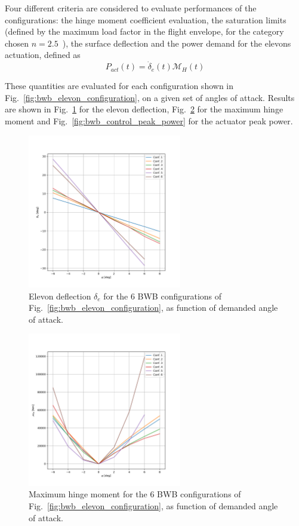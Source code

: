 Four different criteria are considered to evaluate performances of the configurations: the hinge moment coefficient evaluation, the saturation limits (defined by the maximum load factor in the flight envelope, for the category chosen $n=2.5$~\cite{bib:megson}), the surface deflection and the power demand for the elevons actuation, defined as~\cite{bib:fraj}
\begin{equation}
	\label{eq:actuator_power_demand}
	P_{act}\left(t\right) = \dot{\delta}_{e}\left(t\right)\mathcal{M}_{H}\left(t\right)
\end{equation}

These quantities are evaluated for each configuration shown in Fig.~\ref{fig:bwb_elevon_configuration}, on a given set of angles of attack. 
Results are shown in Fig.~\ref{fig:bwb_control_elevon_deflection} for the elevon deflection, Fig.~\ref{fig:bwb_control_hinge_moment} for the maximum hinge moment and Fig.~\ref{fig:bwb_control_peak_power} for the actuator peak power. 
\begin{figure}[!h]
	\centering
	\includegraphics[keepaspectratio, width=0.6\textwidth]{images/chap4/bwb_control_elevon_deflection}
	\caption{Elevon deflection $\delta_{e}$ for the 6 BWB configurations of Fig.~\ref{fig:bwb_elevon_configuration}, as function of demanded angle of attack.}
	\label{fig:bwb_control_elevon_deflection}
\end{figure}
\begin{figure}[!h]
	\centering
	\includegraphics[keepaspectratio, width=0.6\textwidth]{images/chap4/bwb_control_hinge_moment}
	\caption{Maximum hinge moment for the 6 BWB configurations of Fig.~\ref{fig:bwb_elevon_configuration}, as function of demanded angle of attack.}
	\label{fig:bwb_control_hinge_moment}
\end{figure}
